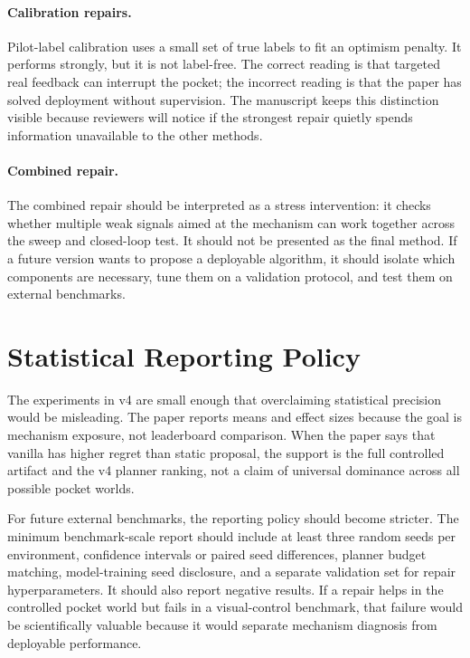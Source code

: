 \paragraph{Calibration repairs.}
Pilot-label calibration uses a small set of true labels to fit an optimism
penalty. It performs strongly, but it is not label-free. The correct reading is
that targeted real feedback can interrupt the pocket; the incorrect reading is
that the paper has solved deployment without supervision. The manuscript keeps
this distinction visible because reviewers will notice if the strongest repair
quietly spends information unavailable to the other methods.

\paragraph{Combined repair.}
The combined repair should be interpreted as a stress intervention: it checks
whether multiple weak signals aimed at the mechanism can work together across
the sweep and closed-loop test. It should not be presented as the final method.
If a future version wants to propose a deployable algorithm, it should isolate
which components are necessary, tune them on a validation protocol, and test
them on external benchmarks.

\section{Statistical Reporting Policy}
\label{app:stat-policy}

The experiments in v4 are small enough that overclaiming statistical
precision would be misleading. The paper reports means and effect sizes
because the goal is mechanism exposure, not leaderboard comparison. When the
paper says that vanilla \cem{} has higher regret than static proposal, the
support is the full controlled artifact and the v4 planner ranking, not a
claim of universal dominance across all possible pocket worlds.

For future external benchmarks, the reporting policy should become stricter.
The minimum benchmark-scale report should include at least three random seeds
per environment, confidence intervals or paired seed differences, planner
budget matching, model-training seed disclosure, and a separate validation set
for repair hyperparameters. It should also report negative results. If a
repair helps in the controlled pocket world but fails in a visual-control
benchmark, that failure would be scientifically valuable because it would
separate mechanism diagnosis from deployable performance.

